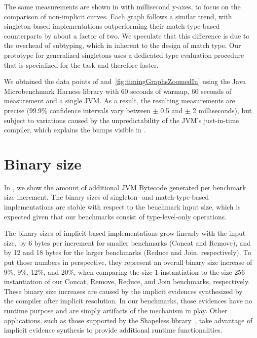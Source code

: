 
The same measurements are shown in  with millisecond y-axes, to focus on the comparison of non-implicit curves.
Each graph follows a similar trend, with singleton-based implementations outperforming their match-type-based counterparts by about a factor of two.
We speculate that this difference is due to the overhead of subtyping, which in inherent to the design of match type.
Our prototype for generalized singletons uses a dedicated type evaluation procedure that is specialized for the task and therefore faster.

We obtained the data points of  and~\ref{fig:timingGraphsZoomedIn} using the Java Microbenchmark Harness library with 60 seconds of warmup, 60 seconds of measurement and a single JVM.
As a result, the resulting measurements are precise (99.9\% confidence intervals vary between $\pm$ 0.5 and $\pm$ 2 milliseconds), but subject to variations caused by the unpredictability of the JVM's just-in-time compiler, which explains the bumps visible in .

\section{Binary size}
\label{sec:binary-size}


In , we show the amount of additional JVM Bytecode generated per benchmark size increment.
The binary sizes of singleton- and match-type-based implementations are stable with respect to the benchmark input size, which is expected given that our benchmarks consist of type-level-only operations.

The binary sizes of implicit-based implementations grow linearly with the input size, by 6 bytes per increment for smaller benchmarks (Concat and Remove), and by 12 and 18 bytes for the larger benchmarks (Reduce and Join, respectively).
To put those numbers in perspective, they represent an overall binary size increase of 9\%, 9\%, 12\%, and 20\%, when comparing the size-1 instantiation to the size-256 instantiation of our Concat, Remove, Reduce, and Join benchmarks, respectively.
These binary size increases are caused by the implicit evidences synthesized by the compiler after implicit resolution.
In our benchmarks, those evidences have no runtime purpose and are simply artifacts of the mechanism in play.
Other applications, such as those supported by the Shapeless library~\citep{sabin2011shapeless}, take advantage of implicit evidence synthesis to provide additional runtime functionalities.

